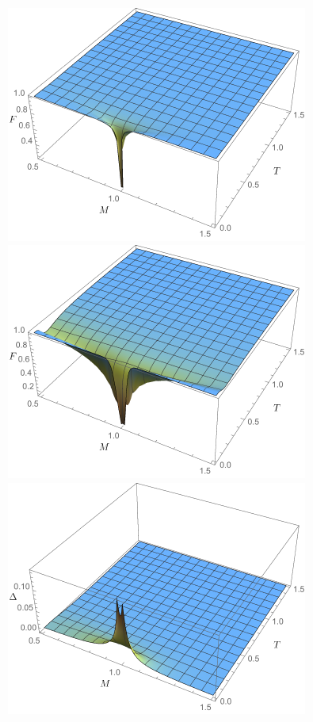 \begin{figure}[h!]
\begin{minipage}{0.32\textwidth}
\includegraphics[width=0.7\textwidth,height=0.6\textwidth]{CL_fidelity_theta.pdf}
\end{minipage}
\begin{minipage}{0.32\textwidth}
\includegraphics[width=0.7\textwidth,height=0.6\textwidth]{CL_fidelity_T.pdf}
\end{minipage}
\begin{minipage}{0.32\textwidth}
\includegraphics[width=0.7\textwidth,height=0.6\textwidth]{CL_uhlmann_theta.pdf}

\end{minipage}
\end{figure}
